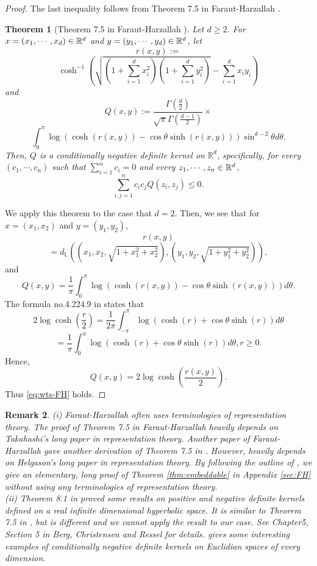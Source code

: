 \documentclass[journal]{IEEEtran}
\newtheorem{theorem}{Theorem}
\newtheorem{remark}[theorem]{Remark}
\begin{document}
\begin{proof}
The last inequality follows from Theorem 7.5 in Faraut-Harzallah \cite{Faraut-1974}. 
\begin{theorem}[Theorem 7.5 in Faraut-Harzallah \cite{Faraut-1974}]
Let $d \ge 2$. 
For $x = (x_1, \cdots, x_d) \in {\mathbb{R}}^d$ and $y = (y_1, \cdots, y_d) \in {\mathbb{R}}^d$,
let 
\[ r(x,y) := \]
\[ \cosh^{-1} \left(\sqrt{\left(1+\sum_{i=1}^{d} x_i^2\right)\left(1+\sum_{i=1}^{d} y_i^2\right)} - \sum_{i=1}^{d} x_i y_i\right) \]
and 
\[ Q(x,y) := \frac{\Gamma(\frac{d}{2})}{\sqrt{\pi} \Gamma(\frac{d-1}{2})} \times\]
\[ \int_0^{\pi} \log\left( \cosh(r(x,y)) - \cos\theta \sinh(r(x,y)) \right) \sin^{d-2} \theta d\theta. \]
Then, $Q$ is a conditionally negative definite kernel on $\mathbb{R}^d$, specifically, 
for every $(c_1, \cdots, c_n)$ such that $\sum_{i=1}^{n} c_i = 0$ and every $z_1, \cdots, z_n \in {\mathbb{R}}^d$, 
\begin{equation*}
\sum_{i,j=1}^{n} c_i c_j Q(z_i, z_j) \le 0.
\end{equation*}
\end{theorem}

We apply this theorem to the case that $d=2$. 
Then, we see that for $x = (x_1, x_2)$ and $y = (y_1, y_2)$,
\[ r(x,y) \]
\[= d_{\mathbb L}\left(\left(x_1, x_2, \sqrt{1+x_1^2+x_2^2}\right), \left(y_1, y_2, \sqrt{1+y_1^2+y_2^2}\right)\right), \]
and 
\[ Q(x,y) = \frac{1}{\pi} \int_0^{\pi} \log\left( \cosh(r(x,y)) - \cos\theta \sinh(r(x,y)) \right) d\theta. \]
The formula no.4.224.9 in \cite{gradshteyn2014table} states that 
\[ 2 \log \cosh \left(\frac{r}{2}\right) = \frac{1}{2\pi} \int_{-\pi}^{\pi} \log\left(\cosh(r) + \cos\theta \sinh (r) \right) d\theta \]
\[= \frac{1}{\pi} \int_{0}^{\pi} \log\left(\cosh(r) + \cos\theta \sinh (r) \right) d\theta,  r \ge 0. \]
Hence, 
\[ Q(x,y) = 2 \log \cosh \left(\frac{r(x,y)}{2}\right). \]
Thus \eqref{eq:wts-FH} holds. 
\end{proof}


\begin{remark}\label{rem:FH}
(i) 
Faraut-Harzallah \cite{Faraut-1974} often uses terminologies of representation theory. 
The proof of Theorem 7.5 in Faraut-Harzallah \cite{Faraut-1974} heavily depends on Takahashi's long paper \cite{Takahashi-1963} in representation theory.  
Another paper of Faraut-Harzallah \cite{Faraut-1972} gave another derivation of  Theorem 7.5 in \cite{Faraut-1974}. 
However, \cite{Faraut-1972} heavily depends on Helgason's long paper \cite{Helgason-1970} in representation theory.  
By following the outline of \cite{Faraut-1972}, 
we give an elementary, long proof of Theorem \ref{thm:embeddable}  in Appendix \ref{sec:FH} without using any terminologies of representation theory.  \\
(ii) Theorem 8.1 in \cite{Faraut-1974} proved some results on positive and negative definite kernels defined on a real infinite dimensional hyperbolic space. 
It is similar to Theorem 7.5 in \cite{Faraut-1974}, but is different and we cannot apply the result to our case.  
See  Chapter5, Section 5 in Berg, Christensen and Ressel \cite{Berg1984} for details. 
\cite{Faraut-1974} gives some interesting examples of conditionally negative definite kernels on Euclidian spaces of every dimension. 
\end{remark}
\end{document}
